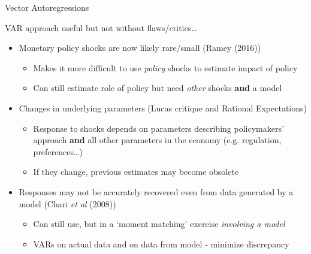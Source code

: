 \begin{frame}{Vector Autoregressions}

VAR approach useful but not without flaws/critics\ldots
\vspace{2mm}
\begin{itemize}
\item 	Monetary policy shocks are now likely rare/small (Ramey (2016))
	\begin{itemize}
	\item	Makes it more difficult to use \emph{policy} shocks to estimate impact of policy
	\item	Can still estimate role of policy but need \emph{other} shocks \textbf{and} a model
	\end{itemize}
\vspace{1mm}
\item	Changes in underlying parameters (Lucas critique and Rational Expectations)
	\begin{itemize}
	\item	Response to shocks depends on parameters describing policymakers' approach \textbf{and} all other parameters in the economy (e.g. regulation, preferences\ldots)
	\item	If they change, previous estimates may become obsolete
	\end{itemize}
\vspace{1mm}	
\item 	Responses may not be accurately recovered even from data generated by a model (Chari \emph{et al} (2008))
	\begin{itemize}
	\item	Can still use, but in a `moment matching' exercise \emph{involving a model}
	\item	VARs on actual data and on data from model - minimize discrepancy
	\end{itemize}
\end{itemize}

\end{frame}



